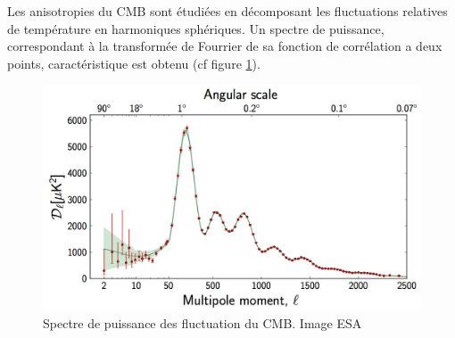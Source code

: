 Les anisotropies du \ac{CMB} sont étudiées en décomposant les fluctuations relatives de température en harmoniques sphériques.
Un spectre de puissance, correspondant à la transformée de Fourrier de sa fonction de corrélation a deux points, caractéristique est obtenu (cf figure \ref{fig:cmb_power_spectrum}).

%
%
%
%
%
%


\begin{figure}[bth]
        \includegraphics[width=.95\linewidth]{img/01/CMB_power_spectrum.png} 
        \caption[Spectre de puissance des fluctuation du CMB]{Spectre de puissance des fluctuation du \ac{CMB}.
        Image ESA}
 		\label{fig:cmb_power_spectrum}
\end{figure}

